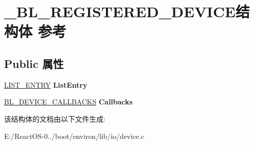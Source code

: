 \hypertarget{struct___b_l___r_e_g_i_s_t_e_r_e_d___d_e_v_i_c_e}{}\section{\+\_\+\+B\+L\+\_\+\+R\+E\+G\+I\+S\+T\+E\+R\+E\+D\+\_\+\+D\+E\+V\+I\+C\+E结构体 参考}
\label{struct___b_l___r_e_g_i_s_t_e_r_e_d___d_e_v_i_c_e}
\subsection*{Public 属性}
\begin{DoxyCompactItemize}
\item 
\mbox{\label{struct___b_l___r_e_g_i_s_t_e_r_e_d___d_e_v_i_c_e_a84f210427cab4c07f41d35c6c0cde063}} 
\hyperlink{struct___l_i_s_t___e_n_t_r_y}{L\+I\+S\+T\+\_\+\+E\+N\+T\+RY} {\bfseries List\+Entry}
\item 
\mbox{\label{struct___b_l___r_e_g_i_s_t_e_r_e_d___d_e_v_i_c_e_a4d22b2e5310b8254fd1b3e2d1682e768}} 
\hyperlink{struct___b_l___d_e_v_i_c_e___c_a_l_l_b_a_c_k_s}{B\+L\+\_\+\+D\+E\+V\+I\+C\+E\+\_\+\+C\+A\+L\+L\+B\+A\+C\+KS} {\bfseries Callbacks}
\end{DoxyCompactItemize}


该结构体的文档由以下文件生成\+:\begin{DoxyCompactItemize}
\item 
E\+:/\+React\+O\+S-\/0../boot/environ/lib/io/device.\+c\end{DoxyCompactItemize}
